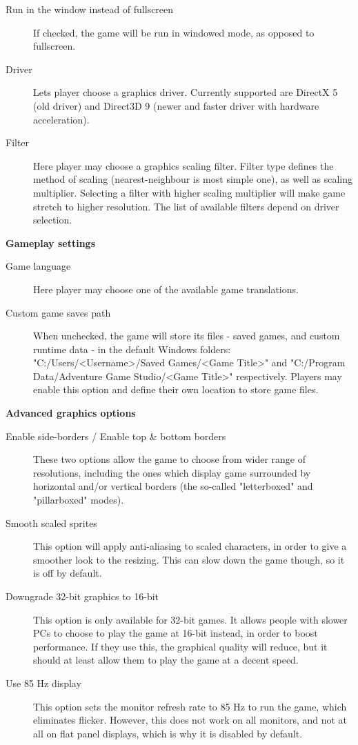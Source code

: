 \begin{description}
\item [Run in the window instead of fullscreen]
  If checked, the game will be run in windowed mode, as opposed to fullscreen.
\item [Driver]
  Lets player choose a graphics driver. Currently supported are DirectX 5 (old driver)
and Direct3D 9 (newer and faster driver with hardware acceleration).
\item [Filter]
  Here player may choose a graphics scaling filter. Filter type defines the method of
scaling (nearest-neighbour is most simple one), as well as scaling multiplier.
  Selecting a filter with higher scaling multiplier will make game stretch to higher resolution.
  The list of available filters depend on driver selection.
\end{description}

\bf{Gameplay settings}

\begin{description}
\item [Game language]
  Here player may choose one of the available game translations.
\item [Custom game saves path]
  When unchecked, the game will store its files - saved games, and custom runtime data -
in the default Windows folders: "C:/Users/<Username>/Saved Games/<Game Title>" and
"C:/Program Data/Adventure Game Studio/<Game Title>" respectively.
  Players may enable this option and define their own location to store game files.
\end{description}

\bf{Advanced graphics options}

\begin{description}
\item [Enable side-borders / Enable top & bottom borders]
  These two options allow the game to choose from wider range of resolutions, including
the ones which display game surrounded by horizontal and/or vertical borders (the
so-called "letterboxed" and "pillarboxed" modes).
\item [Smooth scaled sprites]
  This option will apply anti-aliasing to scaled characters, in order to give
a smoother look to the resizing. This can slow down the game though, so it is off by default.
\item [Downgrade 32-bit graphics to 16-bit]
  This option is only available for 32-bit games. It allows people with slower PCs
to choose to play the game at 16-bit instead, in order to boost performance.
If they use this, the graphical quality will reduce, but it should at least allow them to play
the game at a decent speed.
\item [Use 85 Hz display]
  This option sets the monitor refresh rate to 85 Hz to run the game, which eliminates flicker. However, this does not work on all monitors, and not at all on flat
panel displays, which is why it is disabled by default.
\end{description}

